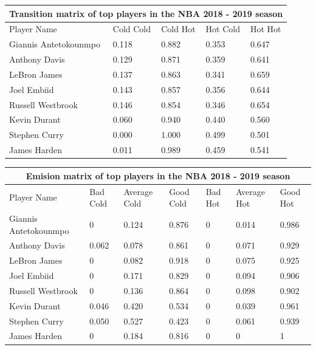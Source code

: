 \documentclass[12pt, authoryear]{elsarticle}
\begin{document}
\begin{tabular}{ |p{3cm}||p{2cm}|p{2cm}|p{2cm}|p{2cm}|  }
	\hline
	\multicolumn{5}{|c|}{Transition matrix of top players in the NBA 2018 - 2019 season} \\
	\hline
	Player Name & Cold Cold & Cold Hot &Hot Cold & Hot Hot\\
	\hline
	Giannis Antetokounmpo&   0.118 &	0.882 &	0.353 &	0.647\\
	Anthony Davis&   0.129&	0.871&	0.359&	0.641\\
	LeBron James &0.137&	0.863&	0.341&	0.659\\
	Joel Embiid&   0.143&	0.857&	0.356&	0.644\\
	Russell Westbrook& 0.146&	0.854&	0.346&	0.654\\
	Kevin Durant&   0.060&	0.940&	0.440&	0.560\\
	Stephen Curry& 0.000&	1.000&	0.499&	0.501\\
	James Harden&  0.011&	0.989&	0.459&	0.541\\
	\hline
\end{tabular}

\noindent\begin{tabular}{ |p{3cm}||p{1.5cm}|p{1.5cm}|p{1.5cm}|p{1.5cm}|p{1.5cm}|p{1.5cm}|  }
	\hline
	\multicolumn{7}{|c|}{Emision matrix of top players in the NBA 2018 - 2019 season} \\
	\hline
	Player Name &Bad Cold& Average Cold&	Good Cold&	Bad Hot&	Average Hot&	Good Hot\\
	\hline
	Giannis Antetokounmpo&   0&	0.124&	0.876&	0&	0.014&	0.986\\
	Anthony Davis&   0.062&	0.078&	0.861&	0&	0.071&	0.929\\
	LeBron James &0&	0.082&	0.918&	0&	0.075&	0.925\\
	Joel Embiid& 0& 0.171&	0.829&	0&	0.094&	0.906\\
	Russell Westbrook& 0&	0.136&	0.864&	0&	0.098&	0.902\\
	Kevin Durant&   0.046&	0.420&	0.534&	0&	0.039&	0.961\\
	Stephen Curry& 0.050&	0.527&	0.423&	0&	0.061&	0.939\\
	James Harden&  0&	0.184&	0.816&	0&	0&	1\\
	\hline
\end{tabular}
\end{document}
